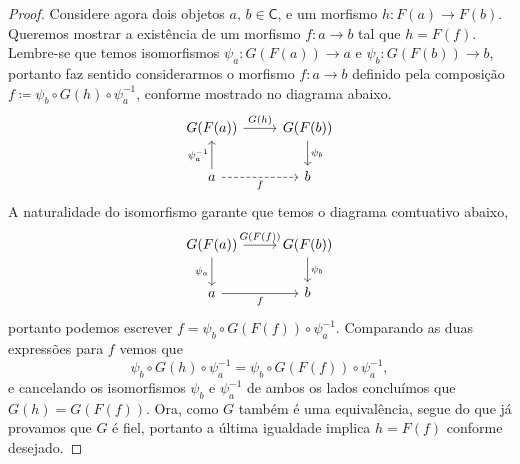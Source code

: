 \begin{proof}
  Considere agora dois objetos $a,\, b \in \mathsf{C}$, e um morfismo $h: F(a) \to F(b)$.
  Queremos mostrar a existência de um morfismo $f: a \to b$ tal que $h = F(f)$.
  Lembre-se que temos isomorfismos $\psi_{a}: G(F(a)) \to a$ e $\psi_{b}: G(F(b)) \to b$, portanto faz sentido considerarmos o morfismo $f: a \to b$ definido pela composição $f \coloneqq \psi_{b} \circ G(h) \circ \psi_{a}^{-1}$, conforme mostrado no diagrama abaixo.
  \begin{displaymath}
    \begin{tikzcd}
      G(F(a))
      \arrow[r, "G(h)"]
      & G(F(b))
      \arrow[d, "\psi_{b}"]
      \\ a
      \arrow[u, "\psi_{a}^{-1}"]
      \arrow[r, dashed, "f" swap]
      & b
    \end{tikzcd}
  \end{displaymath}
  A naturalidade do isomorfismo garante que temos o diagrama comtuativo abaixo,
  \begin{displaymath}
    \begin{tikzcd}
      G(F(a))
      \arrow[r, "G(F(f))"]
      \arrow[d, "\psi_{a}" swap]
      & G(F(b))
      \arrow[d, "\psi_{b}"]
      \\ a
      \arrow[r, "f" swap]
      & b
    \end{tikzcd}
  \end{displaymath}
  portanto podemos escrever $f = \psi_{b} \circ G(F(f)) \circ \psi_{a}^{-1}$.
  Comparando as duas expressões para $f$ vemos que
  \begin{displaymath}
    \psi_{b} \circ G(h) \circ \psi_{a}^{-1} = \psi_{b} \circ G(F(f)) \circ \psi_{a}^{-1},
  \end{displaymath}
  e cancelando os isomorfismos $\psi_{b}$ e $\psi_{a}^{-1}$ de ambos os lados concluímos que $G(h) = G(F(f))$.
  Ora, como $G$ também é uma equivalência, segue do que já provamos que $G$ é fiel, portanto a última igualdade implica $h = F(f)$ conforme desejado.  
\end{proof}



